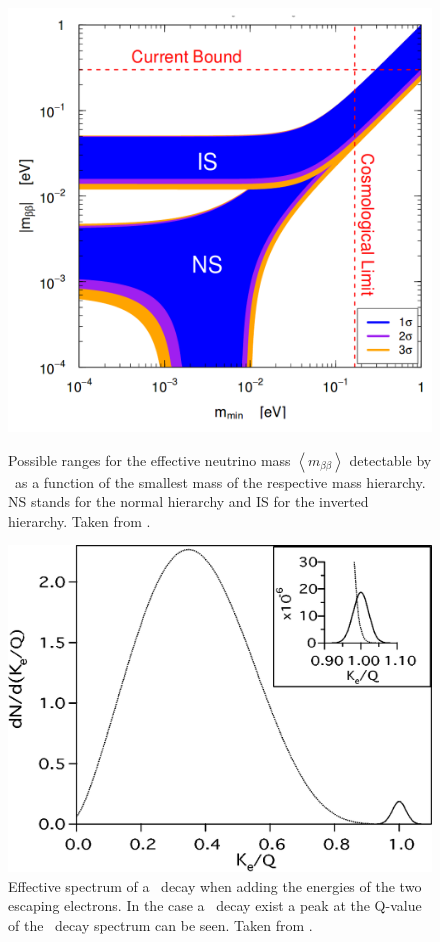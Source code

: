 \documentclass[encoding=utf8,british]{tumphthesis}
\begin{document}
\begin{figure}[t!]
	\centering
	\begin{minipage}{.4125\textwidth}
		\centering
		\includegraphics[width=\textwidth]{./Bilder/NeutrinoMassOrdering.png}
		\caption{Possible ranges for the effective neutrino mass $\left\langle m_{\beta\beta}\right\rangle$ detectable by \onbb\ as a function of the smallest mass of the respective mass hierarchy. NS stands for the normal hierarchy and IS for the inverted hierarchy. Taken from \cite{bilenky_neutrinoless_2012}.}
		\label{fig:MassOrder}
	\end{minipage}\hfill%
	\begin{minipage}{.5\textwidth}
		\centering
		\includegraphics[width=\textwidth]{./Bilder/TheoretischesSpektrmdes0nubbDecay.png}
		\caption{Effective spectrum of a \twonu\ decay when adding the energies of the two escaping electrons. In the case a \onbb\ decay exist a peak at the Q-value of the \twonu\ decay spectrum can be seen. Taken from \cite{elliott_double_2002}.}
		\label{fig:TheoSpektrum}
	\end{minipage}
\end{figure}
\end{document}
